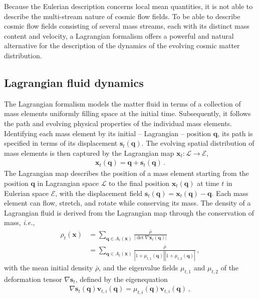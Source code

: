 \documentclass[a4paper, 11pt]{article}
\begin{document}
Because the Eulerian description concerns local mean quantities, it is not able to describe the multi-stream nature of cosmic flow fields. To be able to describe cosmic flow fields consisting of several mass streams, each with its distinct mass content and velocity, a Lagrangian formalism offers a powerful and natural alternative for the description of the dynamics of the evolving cosmic matter distribution. 

\subsection{Lagrangian fluid dynamics}
The Lagrangian formalism models the matter fluid in terms of a collection of mass elements uniformly filling space at the initial time. Subsequently, it follows the path and evolving physical properties of the individual mass elements. Identifying each mass element by its initial -- Lagrangian -- position $\bm{q}$, its path is specified in terms of its displacement $\bm{s}_t(\bm{q})$. The evolving spatial distribution of mass elements is then captured by the Lagrangian map $\bm{x}_t:\mathcal{L}\to \mathcal{E}$,
\begin{align}
\bm{x}_t(\bm{q}) = \bm{q} + \bm{s}_t(\bm{q})\,.
\end{align}
The Lagrangian map describes the position of a mass element starting from the position $\bm{q}$ in Lagrangian space $\mathcal{L}$ to the final position $\bm{x}_t(\bm{q})$ at time $t$ in Eulerian space $\mathcal{E}$, with the displacement field $\bm{s}_t(\bm{q})= \bm{x}_t(\bm{q}) - \bm{q}$. Each mass element can flow, stretch, and rotate while conserving its mass. The density of a Lagrangian fluid is derived from the Lagrangian map through the conservation of mass, \textit{i.e.},
\begin{align}
\rho_t(\bm{x})
&= \sum_{\bm{q} \in A_t(\bm{x})} \frac{\bar{\rho}}{|\det \nabla \bm{x}_t(\bm{q})|}\nonumber\\
&= \sum_{\bm{q} \in A_t(\bm{x})} \frac{\bar{\rho}}{|1+\mu_{t,1}(\bm{q})||1+\mu_{t,2}(\bm{q})|}\,,
\label{eq:density}
\end{align}
with the mean initial density $\bar{\rho}$, and the eigenvalue fields $\mu_{t,1}$ and $\mu_{t,2}$ of the deformation tensor $\nabla \bm{s}_t$, defined by the eigenequation
\begin{align}
\nabla \bm{s}_t(\bm{q}) \bm{v}_{t,i}(\bm{q}) = \mu_{t,i}(\bm{q}) \bm{v}_{t,i}(\bm{q})\,,
\label{eq:EigenvalueAndEigenvector}
\end{align} 
\end{document}
